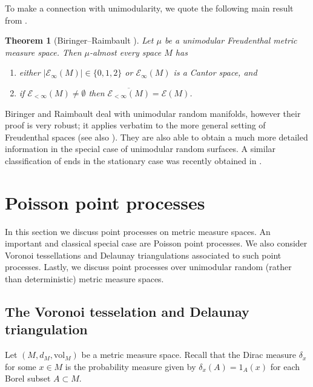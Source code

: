 \documentclass{amsart}
\newcommand{\vol}{\mathrm{vol}}
\newcommand{\Ends}[1]{\mathcal{E}\left(#1\right)}
\newcommand{\EndsFin}[1]{\mathcal{E}_{<\infty}\left(#1\right)}
\newcommand{\EndsInf}[1]{\mathcal{E}_{\infty}\left(#1\right)}
\theoremstyle{plain}
\newtheorem{theorem}{Theorem}[section]
\newtheorem{lemma}[theorem]{Lemma}
\numberwithin{equation}{section}
\theoremstyle{definition}
\begin{document}

To make a connection with unimodularity, we quote the following main result from \cite{biringer2017ends}.

\begin{theorem}[Biringer--Raimbault \cite{biringer2017ends}]
\label{thm:Biringer--Raimbault}
Let $\mu$ be a unimodular Freudenthal metric measure space. Then $\mu$-almost every space $M$ has
\begin{enumerate}
    \item either $|\EndsInf{M}| \in \{0,1,2\}$ or $\EndsInf{M}$ is a Cantor space, and
    \item if $\EndsFin{M} \neq \emptyset$ then $\overline{\EndsFin{M}} = \Ends{M}$.
\end{enumerate}
\end{theorem}

Biringer and Raimbault deal with unimodular random manifolds, however their proof is very robust; it applies verbatim to the more general setting of Freudenthal spaces (see also \cite{khezeli2023unimodular}). They are also able to obtain a much more detailed information in the special case of unimodular random surfaces. A similar classification of ends in the stationary case was recently obtained in \cite{Kfir}.

\section{Poisson point processes}
\label{sec:poisson point processes}

In this section we discuss point processes on metric measure spaces. An important and classical special case are Poisson point processes. We also consider Voronoi tessellations and Delaunay triangulations associated to such point processes. Lastly, we discuss point processes over unimodular random (rather than deterministic) metric measure spaces. 

\subsection{The Voronoi tesselation and Delaunay triangulation} \label{sub:voronoi}
Let $(M,d_M,\vol_M)$ be a metric measure space.
Recall that the Dirac measure $\delta_x$ for some $x\in M$ is the probability measure given by $\delta_x(A) = 1_A(x)$ for each Borel subset $A \subset M$.
\end{document}

